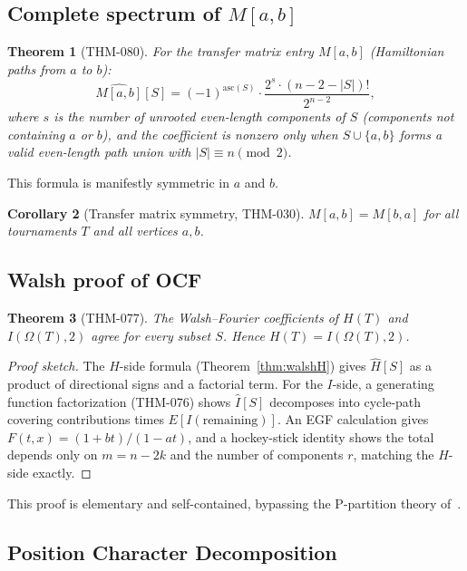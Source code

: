 \documentclass[12pt,reqno]{amsart}
\theoremstyle{plain}
\newtheorem{theorem}{Theorem}[section]
\newtheorem{corollary}[theorem]{Corollary}
\theoremstyle{definition}
\theoremstyle{remark}
\begin{document}
\subsection{Complete spectrum of $M[a,b]$}

\begin{theorem}[THM-080]\label{thm:walshM}
For the transfer matrix entry $M[a,b]$ (Hamiltonian paths from $a$ to $b$):
\[
\widehat{M[a,b]}[S] = (-1)^{\mathrm{asc}(S)} \cdot \frac{2^s \cdot (n-2-|S|)!}{2^{n-2}},
\]
where $s$ is the number of unrooted even-length components of $S$ (components
not containing $a$ or $b$), and the coefficient is nonzero only when
$S \cup \{a,b\}$ forms a valid even-length path union with $|S| \equiv n \pmod{2}$.
\end{theorem}

This formula is manifestly symmetric in $a$ and $b$.

\begin{corollary}[Transfer matrix symmetry, THM-030]
$M[a,b] = M[b,a]$ for all tournaments $T$ and all vertices $a, b$.
\end{corollary}

\subsection{Walsh proof of OCF}

\begin{theorem}[THM-077]\label{thm:walshocf}
The Walsh--Fourier coefficients of $H(T)$ and $I(\Omega(T), 2)$ agree for
every subset $S$. Hence $H(T) = I(\Omega(T), 2)$.
\end{theorem}

\begin{proof}[Proof sketch]
The $H$-side formula (Theorem~\ref{thm:walshH}) gives $\hat{H}[S]$ as a
product of directional signs and a factorial term. For the $I$-side, a
generating function factorization (THM-076) shows $\hat{I}[S]$ decomposes
into cycle-path covering contributions times $E[I(\text{remaining})]$.
An EGF calculation gives $F(t,x) = (1+bt)/(1-at)$, and a hockey-stick
identity shows the total depends only on $m = n - 2k$ and the number of
components $r$, matching the $H$-side exactly.
\end{proof}

This proof is elementary and self-contained, bypassing the P-partition
theory of~\cite{GrinbergStanley2024}.

\subsection{Position Character Decomposition}
\end{document}
